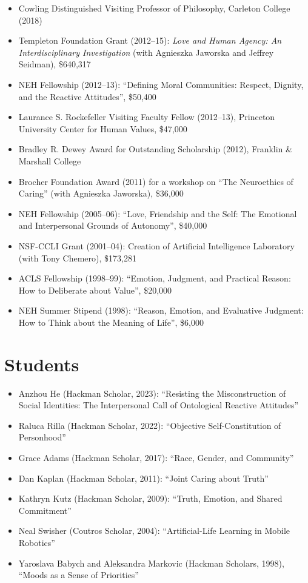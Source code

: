 \documentclass[%
  11pt,%
]{article}
\begin{document}
\begin{itemize}

  \item Cowling Distinguished Visiting Professor of Philosophy, Carleton College (2018)
  \item Templeton Foundation Grant (2012--15): \emph{Love and Human Agency: An Interdisciplinary Investigation} (with Agnieszka Jaworska and Jeffrey Seidman), \$640,317
  \item NEH Fellowship (2012--13): \enquote{Defining Moral Communities: Respect, Dignity, and the Reactive Attitudes}, \$50,400
  \item Laurance S. Rockefeller Visiting Faculty Fellow (2012--13), Princeton University Center for Human Values, \$47,000
  \item Bradley R. Dewey Award for Outstanding Scholarship (2012), Franklin \& Marshall College
  \item Brocher Foundation Award (2011) for a workshop on \enquote{The Neuroethics of Caring} (with Agnieszka Jaworska), \$36,000
  \item NEH Fellowship (2005--06): \enquote{Love, Friendship and the Self: The Emotional and Interpersonal Grounds of Autonomy}, \$40,000
  \item NSF-CCLI Grant (2001--04): Creation of Artificial Intelligence Laboratory (with Tony Chemero), \$173,281
  \item ACLS Fellowship (1998--99): \enquote{Emotion, Judgment, and Practical Reason: How to Deliberate about Value}, \$20,000
  \item NEH Summer Stipend (1998): \enquote{Reason, Emotion, and Evaluative Judgment: How to Think about the Meaning of Life}, \$6,000

\end{itemize}

\section{Students}

\begin{itemize}

  \item Anzhou He (Hackman Scholar, 2023): \enquote{Resisting the Misconstruction of Social Identities: The Interpersonal Call of Ontological Reactive Attitudes}
  \item Raluca Rilla (Hackman Scholar, 2022): \enquote{Objective Self-Constitution of Personhood}
  \item Grace Adams (Hackman Scholar, 2017): \enquote{Race, Gender, and Community}
  \item Dan Kaplan (Hackman Scholar, 2011): \enquote{Joint Caring about Truth}
  \item Kathryn Kutz (Hackman Scholar, 2009): \enquote{Truth, Emotion, and Shared Commitment}
  \item Neal Swisher (Coutros Scholar, 2004): \enquote{Artificial-Life Learning in Mobile Robotics}
  \item Yaroslava Babych and Aleksandra Markovic (Hackman Scholars, 1998), \enquote{Moods as a Sense of Priorities}

\end{itemize}
\end{document}
